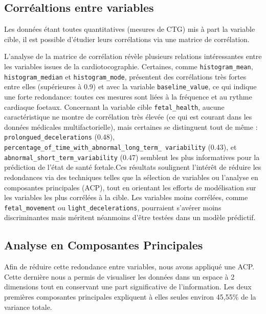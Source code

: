 \documentclass[twocolumn,10pt]{article}
\begin{document}

\subsection{Corréaltions entre variables}\label{subsec:explor:corr}

Les données étant toutes quantitatives (mesures de CTG) mis à part la variable cible, il est possible d'étudier leurs corrélations via une matrice de corrélation. 

L’analyse de la matrice de corrélation révèle plusieurs relations intéressantes entre les variables issues de la cardiotocographie. Certaines, comme \texttt{histogram\_mean}, \texttt{histogram\_median} et \texttt{histogram\_mode}, présentent des corrélations très fortes entre elles (supérieures à 0.9) et avec la variable \texttt{baseline\_value}, ce qui indique une forte redondance: toutes ces mesures sont liées à la fréquence et au rythme cardiaque foetaux. Concernant la variable cible \texttt{fetal\_health}, aucune caractéristique ne montre de corrélation très élevée (ce qui est courant dans les données médicales multifactorielle), mais certaines se distinguent tout de même : \texttt{prolongued\_decelerations} (0.48), \texttt{percentage\_of\_time\_with\_abnormal\_long\_term\_ variability} (0.43), et \texttt{abnormal\_short\_term\_variability} (0.47) semblent les plus informatives pour la prédiction de l’état de santé fœtale.\newline Ces résultats soulignent l’intérêt de réduire les redondances via des techniques telles que la sélection de variables ou l’analyse en composantes principales (ACP), tout en orientant les efforts de modélisation sur les variables les plus corrélées à la cible. Les variables moins corrélées, comme \texttt{fetal\_movement} ou \texttt{light\_decelerations}, pourraient s’avérer moins discriminantes mais méritent néanmoins d’être testées dans un modèle prédictif.


\subsection{Analyse en Composantes Principales}\label{subsec:explor:acp}

Afin de réduire cette redondance entre variables, nous avons appliqué une ACP. Cette dernière nous a permis de visualiser les données dans un espace à 2 dimensions tout en conservant une part significative de l'information. Les deux premières composantes principales expliquent à elles seules environ 45,55\% de la variance totale.
\end{document}

